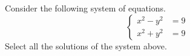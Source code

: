 \documentclass{ximera}
\author{Kenneth Berglund}
\begin{document}
\begin{exercise}
Consider the following system of equations.
$$
\begin{cases}
x^2 - y^2 & = 9 \\
x^2 + y^2 & = 9
\end{cases}
$$
Select all the solutions of the system above.
\begin{selectAll}
\end{selectAll}

\end{exercise}
\end{document}
